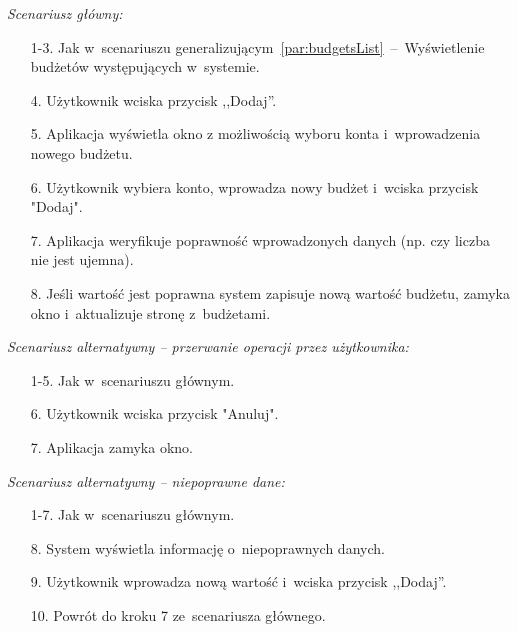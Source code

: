\noindent \textit{Scenariusz główny:}
\begin{enumerate}
  \item[1-3.] Jak w~scenariuszu generalizującym~\ref{par:budgetsList}~--~Wyświetlenie budżetów występujących w~systemie.
  \item[4.] Użytkownik wciska przycisk ,,Dodaj''.
  \item[5.] Aplikacja wyświetla okno z możliwością wyboru konta i~wprowadzenia nowego budżetu.
  \item[6.] Użytkownik wybiera konto, wprowadza nowy budżet i~wciska przycisk "Dodaj".
  \item[7.] Aplikacja weryfikuje poprawność wprowadzonych danych (np. czy liczba nie jest ujemna).
  \item[8.] Jeśli wartość jest poprawna system zapisuje nową wartość budżetu, zamyka okno i~aktualizuje stronę z~budżetami.
\end{enumerate}

\noindent \textit{Scenariusz alternatywny -- przerwanie operacji przez użytkownika:}
\begin{enumerate}
  \item[1-5.] Jak w~scenariuszu głównym.
  \item[6.] Użytkownik wciska przycisk "Anuluj".
  \item[7.] Aplikacja zamyka okno.
\end{enumerate}

\noindent \textit{Scenariusz alternatywny -- niepoprawne dane:}
\begin{enumerate}
  \item[1-7.] Jak w~scenariuszu głównym.
  \item[8.] System wyświetla informację o~niepoprawnych danych.
  \item[9.] Użytkownik wprowadza nową wartość i~wciska przycisk ,,Dodaj''.
  \item[10.] Powrót do kroku 7 ze~scenariusza głównego.
\end{enumerate}

